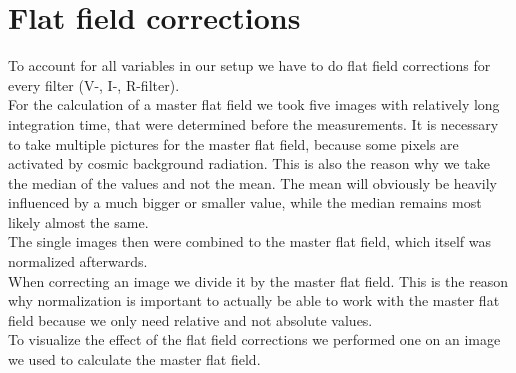 \section{Flat field corrections}
To account for all variables in our setup we have to do flat field corrections for every filter (V-, I-, R-filter). \\
For the calculation of a master flat field we took five images with relatively long integration time, that were determined before the measurements.
It is necessary to take multiple pictures for the master flat field, because some pixels are activated by cosmic background radiation.
This is also the reason why we take the median of the values and not the mean. 
The mean will obviously be heavily influenced by a much bigger or smaller value, while the median remains most likely almost the same. \\
The single images then were combined to the master flat field, which itself was normalized afterwards.\\
When correcting an image we divide it by the master flat field.
This is the reason why normalization is important to actually be able to work with the master flat field because we only need relative  and not absolute values. \\
To visualize the effect of the flat field corrections we performed one on an image we used to calculate the master flat field.\\
